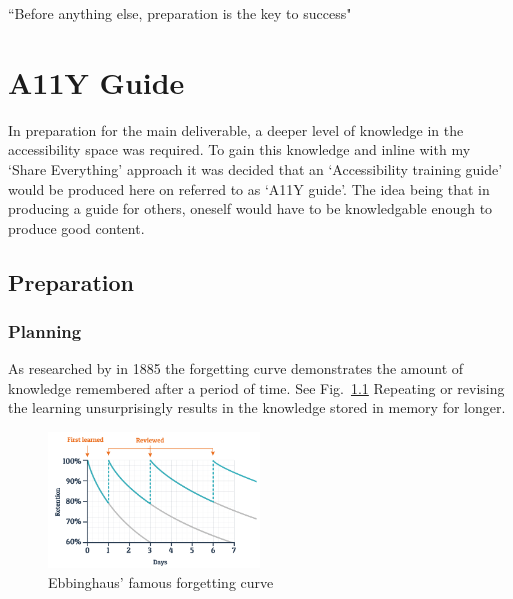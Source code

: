 \begin{savequote}[75mm]
``Before anything else, preparation is the key to success"
\end{savequote}

\chapter{A11Y Guide}
In preparation for the main deliverable, a deeper level of knowledge in the
accessibility space was required. To gain this knowledge and inline with my
`Share Everything' approach it was decided that an `Accessibility
training guide' would be produced here on referred to as `A11Y guide'. The idea
being that in producing a guide for others, oneself would have to be
knowledgable enough to produce good content.

\section{Preparation}
\subsection{Planning}
As researched by \citep{Ebbinghaus} in 1885 the forgetting curve demonstrates the
amount of knowledge remembered after a period of time. See Fig.~\ref{fig:ebbinghaus}
Repeating or revising the learning unsurprisingly results in the knowledge
stored in memory for longer.

\begin{figure}[H]
\centering
\includegraphics[width=0.5\textwidth]{figures/ebbinghaus}
\captionsetup{justification=centering}
\caption{Ebbinghaus' famous forgetting curve
\label{fig:ebbinghaus}}
\end{figure}

